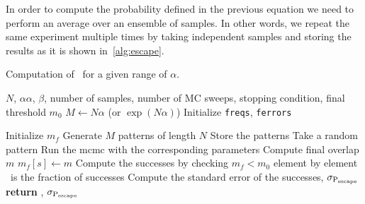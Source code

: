 \documentclass[\rootdir/main.tex]{subfiles}
\begin{document}
In order to compute the probability defined in the previous equation we need to perform an average over an ensemble of samples. In other words, we repeat the same experiment multiple times by taking independent samples and storing the results as it is shown in~\cref{alg:escape}.

\begin{algorithm}
    \caption{Computation of \pesc\ for a given range of $\alpha$.}
    \label{alg:escape}
    \begin{algorithmic}[1]
    \Require $N$, $\alpha \alpha$, $\beta$, number of samples, number of MC sweeps, stopping condition, final threshold $m_0$
    \State $M \gets N\alpha$ (or $\exp(N\alpha)$)
    \State Initialize \texttt{freqs}, \texttt{ferrors} 

        \State Initialize $m_f$ 
            \State Generate $M$ patterns of length $N$
            \State Store the patterns 
            \State Take a random pattern \bxi
            \State Run the \acrshort{mcmc} with the corresponding parameters
            \State Compute final overlap $m$
            \State $m_f[s] \gets m$
        \EndFor
        \State Compute the successes by checking $m_f < m_0$ element by element 
        \State \pesc\ is the fraction of successes
        \State Compute the standard error of the successes, $\sigma_{ \mathrm{P}_{\text{escape}} }$ 
    \EndFor
    \State \textbf{return} \pesc, $\sigma_{ \mathrm{P}_{\text{escape}} }$
    \end{algorithmic}
\end{algorithm}
\end{document}
